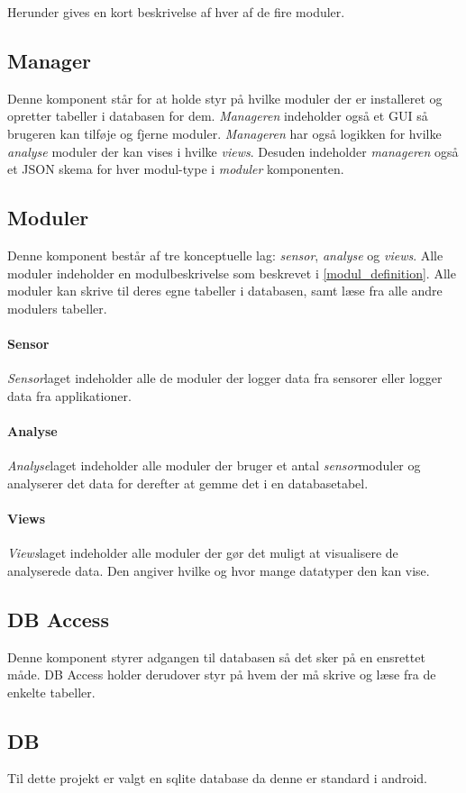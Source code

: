 Herunder gives en kort beskrivelse af hver af de fire moduler.

\subsection*{Manager}
Denne komponent står for at holde styr på hvilke moduler der er installeret og opretter tabeller i databasen for dem.
\textit{Manageren} indeholder også et GUI så brugeren kan tilføje og fjerne moduler.
\textit{Manageren} har også logikken for hvilke \textit{analyse} moduler der kan vises i hvilke \textit{views}.
Desuden indeholder \textit{manageren} også et JSON skema for hver modul-type i \textit{moduler} komponenten.

\subsection*{Moduler}
Denne komponent består af tre konceptuelle lag: \textit{sensor}, \textit{analyse} og \textit{views}.
Alle moduler indeholder en modulbeskrivelse som beskrevet i \cref{modul_definition}. 
Alle moduler kan skrive til deres egne tabeller i databasen, samt læse fra alle andre modulers tabeller.

\paragraph{Sensor} \textit{Sensor}laget indeholder alle de moduler der logger data fra sensorer eller logger data fra applikationer.

\paragraph{Analyse}
\textit{Analyse}laget indeholder alle moduler der bruger et antal \textit{sensor}moduler og analyserer det data for derefter at gemme det i en databasetabel.

\paragraph{Views}
\textit{Views}laget indeholder alle moduler der gør det muligt at visualisere de analyserede data.
Den angiver hvilke og hvor mange datatyper den kan vise.

\subsection*{DB Access}
Denne komponent styrer adgangen til databasen så det sker på en ensrettet måde.
DB Access holder derudover styr på hvem der må skrive og læse fra de enkelte tabeller.

\subsection*{DB}
Til dette projekt er valgt en sqlite database da denne er standard i android.
